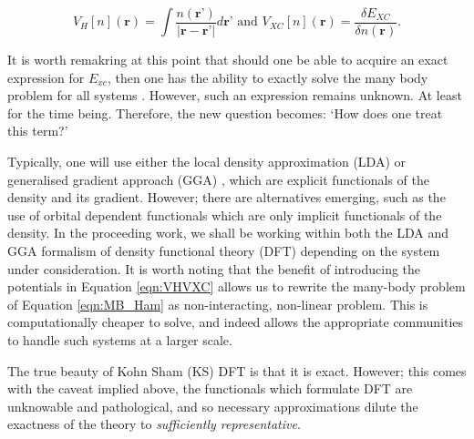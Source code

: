 \begin{equation}
    V_{H}[n](\textbf{r}) = \int \frac{ n(\textbf{r'}) }{ |\textbf{r} - \textbf{r'} | } d\textbf{r'} \text{ and } V_{XC}[n](\textbf{r}) = \frac{\delta E_{XC} }{\delta n(\textbf{r})}.
    \label{eqn:VHVXC}
\end{equation}

It is worth remakring at this point that should one be able to acquire an exact expression for $E_{xc}$, then one has the ability to exactly solve the many body problem for all systems \cite{martin_2004}. However, such an expression remains unknown. At least for the time being. Therefore, the new question becomes: `How does one treat this term?'

 Typically, one will use either the local density approximation (LDA) \cite{KS} or generalised gradient approach (GGA) \cite{Purdue_Yue_GGA,GGA_Simple}, which are explicit functionals of the density and its gradient. However; there are alternatives emerging, such as the use of orbital dependent functionals which are only implicit functionals of the density. In the proceeding work, we shall be working within both the LDA and GGA formalism of density functional theory (DFT) depending on the system under consideration. It is worth noting that the benefit of introducing the potentials in Equation \ref{eqn:VHVXC} allows us to rewrite the many-body problem of Equation \ref{eqn:MB_Ham} as non-interacting, non-linear problem. This is computationally cheaper to solve, and indeed allows the appropriate communities to handle such systems at a larger scale.

The true beauty of Kohn Sham (KS) DFT is that it is exact. However; this comes with the caveat implied above, the functionals which formulate DFT are unknowable and pathological, and so necessary approximations dilute the exactness of the theory to \textit{sufficiently representative}.

